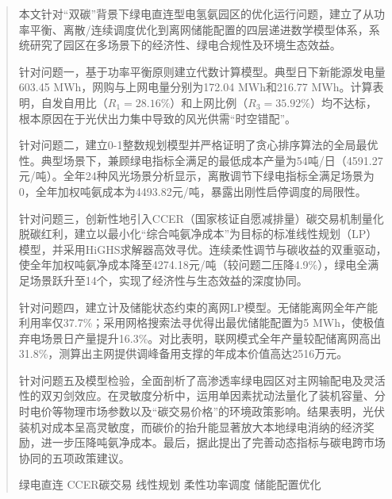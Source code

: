 \documentclass[a4paper]{neepumcm}
\begin{document}
\begin{abstract}

本文针对“双碳”背景下绿电直连型电氢氨园区的优化运行问题，建立了从功率平衡、离散/连续调度优化到离网储能配置的四层递进数学模型体系，系统研究了园区在多场景下的经济性、绿电合规性及环境生态效益。

针对问题一，基于功率平衡原则建立代数计算模型。典型日下新能源发电量603.45 MWh，网购与上网电量分别为172.04 MWh和216.77 MWh。计算表明，自发自用比（$R_1=28.16\%$）和上网比例（$R_3=35.92\%$）均不达标，根本原因在于光伏出力集中导致的风光供需“时空错配”。

针对问题二，建立0-1整数规划模型并严格证明了贪心排序算法的全局最优性。典型场景下，兼顾绿电指标全满足的最低成本产量为54吨/日（4591.27元/吨）。全年24种风光场景分析显示，离散调节下绿电指标全满足场景为0，全年加权吨氨成本为4493.82元/吨，暴露出刚性启停调度的局限性。

针对问题三，创新性地引入CCER（国家核证自愿减排量）碳交易机制量化脱碳红利，建立以最小化“综合吨氨净成本”为目标的标准线性规划（LP）模型，并采用HiGHS求解器高效寻优。连续柔性调节与碳收益的双重驱动，使全年加权吨氨净成本降至4274.18元/吨（较问题二压降4.9\%），绿电全满足场景跃升至14个，实现了经济性与生态效益的深度协同。

针对问题四，建立计及储能状态约束的离网LP模型。无储能离网全年产能利用率仅37.7\%；采用网格搜索法寻优得出最优储能配置为5 MWh，使极值弃电场景日产量提升16.3\%。对比表明，联网模式全年产量较配储离网高出31.8\%，测算出主网提供调峰备用支撑的年成本价值高达2516万元。

针对问题五及模型检验，全面剖析了高渗透率绿电园区对主网输配电及灵活性的双刃剑效应。在灵敏度分析中，运用单因素扰动法量化了装机容量、分时电价等物理市场参数以及“碳交易价格”的环境政策影响。结果表明，光伏装机对成本呈高灵敏度，而碳价的抬升能显著放大本地绿电消纳的经济奖励，进一步压降吨氨净成本。最后，据此提出了完善动态指标与碳电跨市场协同的五项政策建议。

\begin{keywords}
绿电直连 \quad CCER碳交易 \quad 线性规划 \quad 柔性功率调度 \quad 储能配置优化
\end{keywords}
\end{abstract}

\maketitle
\newpage
\clearpage











\end{document}
